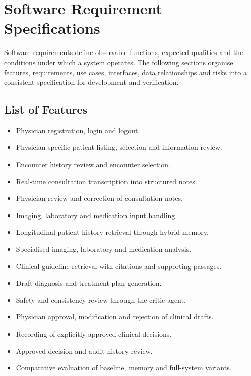 \begingroup
\renewcommand{\encodingdefault}{T1}
\selectfont
\chapter{Software Requirement Specifications}

Software requirements define observable functions, expected qualities and the conditions under which a system operates. The following sections organise features, requirements, use cases, interfaces, data relationships and risks into a consistent specification for development and verification.

\section{List of Features}
\begin{itemize}
\item Physician registration, login and logout.
\item Physician-specific patient listing, selection and information review.
\item Encounter history review and encounter selection.
\item Real-time consultation transcription into structured notes.
\item Physician review and correction of consultation notes.
\item Imaging, laboratory and medication input handling.
\item Longitudinal patient history retrieval through hybrid memory.
\item Specialised imaging, laboratory and medication analysis.
\item Clinical guideline retrieval with citations and supporting passages.
\item Draft diagnosis and treatment plan generation.
\item Safety and consistency review through the critic agent.
\item Physician approval, modification and rejection of clinical drafts.
\item Recording of explicitly approved clinical decisions.
\item Approved decision and audit history review.
\item Comparative evaluation of baseline, memory and full-system variants.
\end{itemize}

